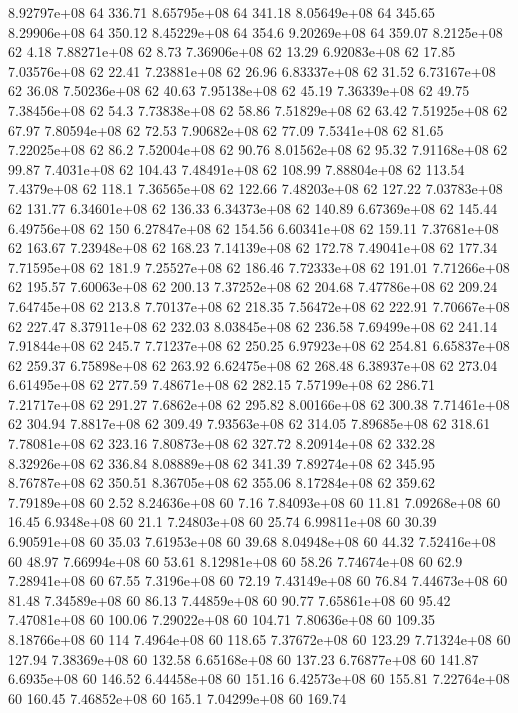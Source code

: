 8.92797e+08 64 336.71
8.65795e+08 64 341.18
8.05649e+08 64 345.65
8.29906e+08 64 350.12
8.45229e+08 64 354.6
9.20269e+08 64 359.07
8.2125e+08 62 4.18
7.88271e+08 62 8.73
7.36906e+08 62 13.29
6.92083e+08 62 17.85
7.03576e+08 62 22.41
7.23881e+08 62 26.96
6.83337e+08 62 31.52
6.73167e+08 62 36.08
7.50236e+08 62 40.63
7.95138e+08 62 45.19
7.36339e+08 62 49.75
7.38456e+08 62 54.3
7.73838e+08 62 58.86
7.51829e+08 62 63.42
7.51925e+08 62 67.97
7.80594e+08 62 72.53
7.90682e+08 62 77.09
7.5341e+08 62 81.65
7.22025e+08 62 86.2
7.52004e+08 62 90.76
8.01562e+08 62 95.32
7.91168e+08 62 99.87
7.4031e+08 62 104.43
7.48491e+08 62 108.99
7.88804e+08 62 113.54
7.4379e+08 62 118.1
7.36565e+08 62 122.66
7.48203e+08 62 127.22
7.03783e+08 62 131.77
6.34601e+08 62 136.33
6.34373e+08 62 140.89
6.67369e+08 62 145.44
6.49756e+08 62 150
6.27847e+08 62 154.56
6.60341e+08 62 159.11
7.37681e+08 62 163.67
7.23948e+08 62 168.23
7.14139e+08 62 172.78
7.49041e+08 62 177.34
7.71595e+08 62 181.9
7.25527e+08 62 186.46
7.72333e+08 62 191.01
7.71266e+08 62 195.57
7.60063e+08 62 200.13
7.37252e+08 62 204.68
7.47786e+08 62 209.24
7.64745e+08 62 213.8
7.70137e+08 62 218.35
7.56472e+08 62 222.91
7.70667e+08 62 227.47
8.37911e+08 62 232.03
8.03845e+08 62 236.58
7.69499e+08 62 241.14
7.91844e+08 62 245.7
7.71237e+08 62 250.25
6.97923e+08 62 254.81
6.65837e+08 62 259.37
6.75898e+08 62 263.92
6.62475e+08 62 268.48
6.38937e+08 62 273.04
6.61495e+08 62 277.59
7.48671e+08 62 282.15
7.57199e+08 62 286.71
7.21717e+08 62 291.27
7.6862e+08 62 295.82
8.00166e+08 62 300.38
7.71461e+08 62 304.94
7.8817e+08 62 309.49
7.93563e+08 62 314.05
7.89685e+08 62 318.61
7.78081e+08 62 323.16
7.80873e+08 62 327.72
8.20914e+08 62 332.28
8.32926e+08 62 336.84
8.08889e+08 62 341.39
7.89274e+08 62 345.95
8.76787e+08 62 350.51
8.36705e+08 62 355.06
8.17284e+08 62 359.62
7.79189e+08 60 2.52
8.24636e+08 60 7.16
7.84093e+08 60 11.81
7.09268e+08 60 16.45
6.9348e+08 60 21.1
7.24803e+08 60 25.74
6.99811e+08 60 30.39
6.90591e+08 60 35.03
7.61953e+08 60 39.68
8.04948e+08 60 44.32
7.52416e+08 60 48.97
7.66994e+08 60 53.61
8.12981e+08 60 58.26
7.74674e+08 60 62.9
7.28941e+08 60 67.55
7.3196e+08 60 72.19
7.43149e+08 60 76.84
7.44673e+08 60 81.48
7.34589e+08 60 86.13
7.44859e+08 60 90.77
7.65861e+08 60 95.42
7.47081e+08 60 100.06
7.29022e+08 60 104.71
7.80636e+08 60 109.35
8.18766e+08 60 114
7.4964e+08 60 118.65
7.37672e+08 60 123.29
7.71324e+08 60 127.94
7.38369e+08 60 132.58
6.65168e+08 60 137.23
6.76877e+08 60 141.87
6.6935e+08 60 146.52
6.44458e+08 60 151.16
6.42573e+08 60 155.81
7.22764e+08 60 160.45
7.46852e+08 60 165.1
7.04299e+08 60 169.74
